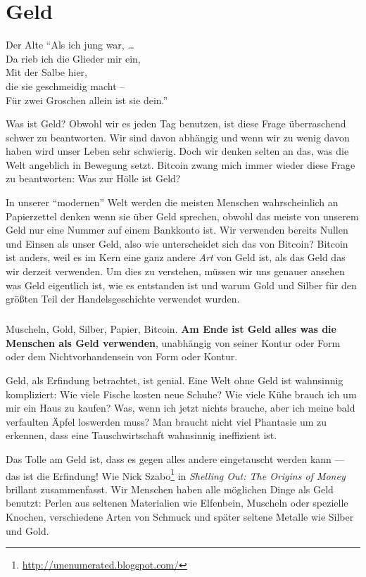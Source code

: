 \chapter{Geld}
\label{les:11}

\begin{chapquote}{Der Alte}
\enquote{Als ich jung war, \ldots \\
Da rieb ich die Glieder mir ein, \\
Mit der Salbe hier, \\
die sie geschmeidig macht -- \\
Für zwei Groschen allein ist sie dein.}
\end{chapquote}

Was ist Geld? Obwohl wir es jeden Tag benutzen, ist diese Frage überraschend
schwer zu beantworten. Wir sind davon abhängig und wenn wir zu wenig davon haben
wird unser Leben sehr schwierig. Doch wir denken selten an das, was die Welt
angeblich in Bewegung setzt. Bitcoin zwang mich immer wieder diese Frage zu
beantworten: Was zur Hölle ist Geld?

In unserer \enquote{modernen} Welt werden die meisten Menschen wahrscheinlich an
Papierzettel denken wenn sie über Geld sprechen, obwohl das meiste von unserem
Geld nur eine Nummer auf einem Bankkonto ist. Wir verwenden bereits Nullen und
Einsen als unser Geld, also wie unterscheidet sich das von Bitcoin? Bitcoin ist
anders, weil es im Kern eine ganz andere \textit{Art} von Geld ist, als das Geld
das wir derzeit verwenden. Um dies zu verstehen, müssen wir uns genauer ansehen
was Geld eigentlich ist, wie es entstanden ist und warum Gold und Silber für den
größten Teil der Handelsgeschichte verwendet wurden.

\paragraph{}
Muscheln, Gold, Silber, Papier, Bitcoin. \textbf{Am Ende ist Geld alles was die
Menschen als Geld verwenden}, unabhängig von seiner Kontur oder Form oder dem
Nichtvorhandensein von Form oder Kontur.

Geld, als Erfindung betrachtet, ist genial. Eine Welt ohne Geld ist wahnsinnig
kompliziert: Wie viele Fische kosten neue Schuhe? Wie viele Kühe brauch ich um
mir ein Haus zu kaufen? Was, wenn ich jetzt nichts brauche, aber ich meine bald
verfaulten Äpfel loswerden muss? Man braucht nicht viel Phantasie um zu
erkennen, dass eine Tauschwirtschaft wahnsinnig ineffizient ist.

Das Tolle am Geld ist, dass es gegen alles andere eingetauscht werden kann ---
das ist die Erfindung! Wie Nick
Szabo\footnote{\url{http://unenumerated.blogspot.com/}} in \textit{Shelling Out:
The Origins of Money} \cite{shelling-out} brillant zusammenfasst. Wir Menschen
haben alle möglichen Dinge als Geld benutzt: Perlen aus seltenen Materialien wie
Elfenbein, Muscheln oder spezielle Knochen, verschiedene Arten von Schmuck und
später seltene Metalle wie Silber und Gold.

